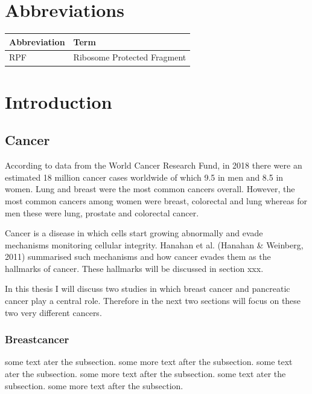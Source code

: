 \documentclass[12pt,openany]{book}
\author{}
\date{\vspace{-2.5em}}
\begin{document}
{
\setcounter{tocdepth}{3}
\tableofcontents
}
\cleardoublepage
\pagestyle{fancy} \fancyhf{} \renewcommand{\headrulewidth}{0pt}
\fancyfoot[LE,RO]{\thepage} \renewcommand{\floatpagefraction}{.9}
\setcounter{page}{9}

\chapter*{Abbreviations}\label{abbreviations}

\begin{tabular}{ll}
\toprule
Abbreviation & Term\\
\midrule
RPF & Ribosome Protected Fragment\\
\bottomrule
\end{tabular}

\chapter{Introduction}

\section{Cancer}

According to data from the World Cancer Research Fund, in 2018 there
were an estimated 18 million cancer cases worldwide of which 9.5 in men
and 8.5 in women. Lung and breast were the most common cancers overall.
However, the most common cancers among women were breast, colorectal and
lung whereas for men these were lung, prostate and colorectal cancer.

Cancer is a disease in which cells start growing abnormally and evade
mechanisms monitoring cellular integrity. Hanahan et al. (Hanahan \&
Weinberg, 2011) summarised such mechanisms and how cancer evades them as
the hallmarks of cancer. These hallmarks will be discussed in section
xxx.

In this thesis I will discuss two studies in which breast cancer and
pancreatic cancer play a central role. Therefore in the next two
sections will focus on these two very different cancers.

\subsection{Breastcancer}

some text ater the subsection. some more text after the subsection. some
text ater the subsection. some more text after the subsection. some text
ater the subsection. some more text after the subsection.
\end{document}
